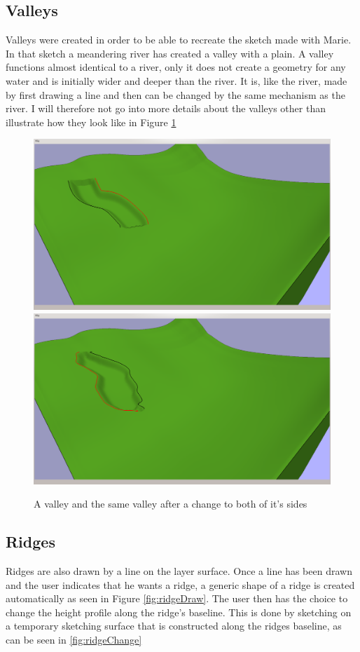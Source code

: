 \documentclass[a4paper,12pt]{report}
\begin{document}
\subsection{Valleys}
Valleys were created in order to be able to recreate the sketch made with Marie. In that sketch a meandering river has created a valley with a plain.
A valley functions almost identical to a river, only it does not create a geometry for any water and is initially wider and deeper than the river. It is, like the river, made by first drawing a line and then can be changed by the same mechanism as the river. I will therefore not go into more details about the valleys other than illustrate how they look like in Figure \ref{fig:valley}
\begin{figure}
\includegraphics[trim = 10mm 80mm 200mm 30mm, clip,width=.5\linewidth]{thesis/results/valleyMade.png}
\includegraphics[trim = 10mm 80mm 200mm 30mm, clip,width=.5\linewidth]{thesis/results/valleyChanged.png}
 \caption{A valley and the same valley after a change to both of it's sides }
 \label{fig:valley}
\end{figure}

\subsection{Ridges}

Ridges are also drawn by a line on the layer surface. Once a line has been drawn and the user indicates that he wants a ridge, a generic shape of a ridge is created automatically as seen in Figure \ref{fig:ridgeDraw}. The user then has the choice to change the height profile along the ridge's baseline. This is done by sketching on a temporary sketching surface that is constructed along the ridges baseline, as can be seen in \ref{fig:ridgeChange}
\end{document}

